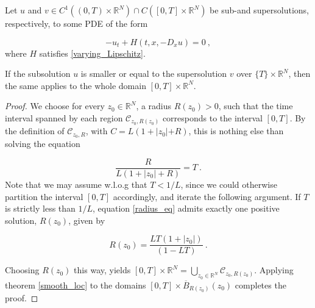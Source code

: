 \begin{corollary}
			\label{Smooth Uniqueness}
			Let $ u $ and $ v \in C^{1}(\left(0, T \right) \times \mathbb{R}^N) \cap C(\left[ 0, T \right] \times \mathbb{R}^{N}) $ be sub-and supersolutions, respectively, to some PDE of the form
			
			\begin{equation*}
				-u_t + H(t, x, -D_x u) = 0 \ ,
			\end{equation*}
			where $ H $ satisfies \eqref{varying_Lipschitz}.
			
			If the subsolution $ u $ is smaller or equal to the supersolution $ v $ over $ \{ T \} \times \mathbb{R}^{N} $, then the same applies to the whole domain $ \left[ 0, T \right] \times \mathbb{R}^{N} $.
			
			\begin{proof}
				We choose for every $ z_0 \in \mathbb{R}^{N} $, a radius $ R(z_0) > 0 $, such that the time interval spanned by each region $ \mathcal{C}_{z_0, R(z_0)} $ corresponds to the interval $ \left[0, T \right] $. By the definition of $ \mathcal{C}_{z_0, R} $, with $ C = L (1 + \lvert z_0 \lvert + R) $, this is nothing else than solving the equation
				
				\begin{equation}
				\label{radius_eq}
					\frac{R}{L(1 + |z_0| + R)} = T \ .
				\end{equation}
				Note that we may assume w.l.o.g that $ T < 1 / L $, since we could otherwise partition the interval $ \left[ 0, T \right] $ accordingly, and iterate the following argument.
				If $ T $ is strictly less than $ 1 / L $, equation \eqref{radius_eq} admits exactly one positive solution, $ R(z_0) $, given by
				
				\begin{equation*}
					R(z_0) = \frac{LT(1 + \lvert z_0 \rvert)}{(1 - LT)} \ .
				\end{equation*}
				
				Choosing $ R(z_0) $ this way, yields $ \left[0, T\right] \times \mathbb{R}^{N} = \bigcup\limits_{z_0 \in \mathbb{R}^{N}} \mathcal{C}_{z_0, R(z_0)} $. Applying theorem \ref{smooth_loc} to the domains $ \left[ 0, T \right] \times \overline{B}_{R(z_0)}(z_0)$ completes the proof.
			\end{proof}
		\end{corollary}